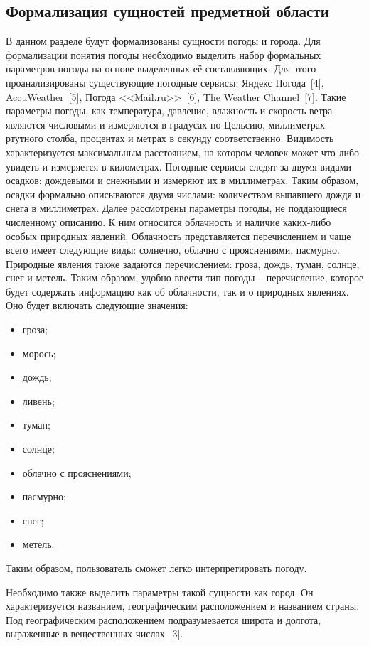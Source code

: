 \subsection{Формализация сущностей предметной области}
В данном разделе будут формализованы сущности погоды и города.
Для формализации понятия погоды необходимо выделить набор формальных параметров погоды на основе выделенных её составляющих.
Для этого проанализированы существующие погодные сервисы: Яндекс Погода~[4], AccuWeather~[5], Погода <<Mail.ru>>~[6], The Weather Channel~[7].
Такие параметры погоды, как температура, давление, влажность и скорость ветра являются числовыми и измеряются в градусах по Цельсию, миллиметрах ртутного столба, процентах и метрах в секунду соответственно.
Видимость характеризуется максимальным расстоянием, на котором человек может что-либо увидеть и измеряется в километрах.
Погодные сервисы следят за двумя видами осадков: дождевыми и снежными и измеряют их в миллиметрах.
Таким образом, осадки формально описываются двумя числами: количеством выпавшего дождя и снега в миллиметрах.
Далее рассмотрены параметры погоды, не поддающиеся численному описанию.
К ним относится облачность и наличие каких-либо особых природных явлений.
Облачность представляется перечислением и чаще всего имеет следующие виды: солнечно, облачно с прояснениями, пасмурно.
Природные явления также задаются перечислением: гроза, дождь, туман, солнце, снег и метель.
Таким образом, удобно ввести тип погоды -- перечисление, которое будет содержать информацию как об облачности, так и о природных явлениях.
Оно будет включать следующие значения:
\begin{itemize}
    \item гроза;
    \item морось;
    \item дождь;
    \item ливень;
    \item туман;
    \item солнце;
    \item облачно с прояснениями;
    \item пасмурно;
    \item снег;
    \item метель.
\end{itemize}
Таким образом, пользователь сможет легко интерпретировать погоду.

Необходимо также выделить параметры такой сущности как город.
Он характеризуется названием, географическим расположением и названием страны.
Под географическим расположением подразумевается широта и долгота, выраженные в вещественных числах~[3].


